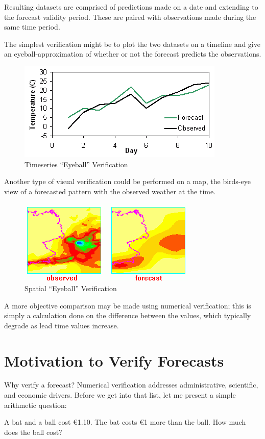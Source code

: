 \documentclass[logos,parttoc,morelanguage=french,morelanguage=german,draft]{orsay-memoire}
\begin{document}
Resulting datasets are comprised of predictions made on a date and extending to the forecast validity period. These are paired with observations made during the same time period.

The simplest verification might be to plot the two datasets on a timeline and give an eyeball-approximation of whether or not the forecast predicts the observations.
\begin{figure}[hb]
\centering
\includegraphics[width=0.45\linewidth]{images/eyeballtimeseries.png}
  \caption{Timeseries ``Eyeball'' Verification}
  \label{fig:eyeballSeries}
\end{figure}


Another type of visual verification could be performed on a map, the birds-eye view of a forecasted pattern with the observed weather at the time.
\begin{figure}[hb]
\centering
\includegraphics[width=0.45\linewidth]{images/DWDmaps.png}
  \caption{Spatial ``Eyeball'' Verification}
  \label{fig:eyeballMap}
\end{figure}

A more objective comparison may be made using numerical verification; this is simply a calculation done on the difference between the values, which typically degrade as lead time values increase.



\section{Motivation to Verify Forecasts}

Why verify a forecast? Numerical verification addresses administrative, scientific, and economic drivers. Before we get into that list, let me present a simple arithmetic question:

A bat and a ball cost €1.10. The bat costs €1 more than the ball. How much does the ball cost?
\end{document}
